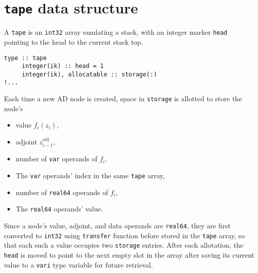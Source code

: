 \documentclass[12pt, reqno, oneside]{amsbook}
\begin{document}
\section{\texttt{tape} data structure}
\label{sec:orgc10c16c}
A \texttt{tape} is an \texttt{int32} array emulating a stack, with an integer marker \texttt{head} pointing to the
head to the current stack top.
\begin{verbatim}
type :: tape
     integer(ik) :: head = 1
     integer(ik), allocatable :: storage(:)
!...
\end{verbatim}
Each time a new AD node is created,
space in \texttt{storage} is allotted to store the node's
\begin{itemize}
\item value \(f_i(z_i)\),
\item adjoint \(z_{i-1}^{\text{adj}}\),
\item number of \texttt{var} operands of \(f_i\),
\item The \texttt{var} operands' index in the same \texttt{tape} array,
\item number of \texttt{real64} operands of \(f_i\),
\item The \texttt{real64} operands' value.
\end{itemize}

Since a node's value, adjoint, and data
operands are \texttt{real64}, they are first converted to \texttt{int32} using
\texttt{transfer} function before stored in the \texttt{tape} array, so that each such
a value occupies two \texttt{storage} entries. After each
allotation, the \texttt{head} is moved to point to the next empty slot in
the array after saving its current value to a \texttt{vari} type variable
for future retrieval.
\end{document}
